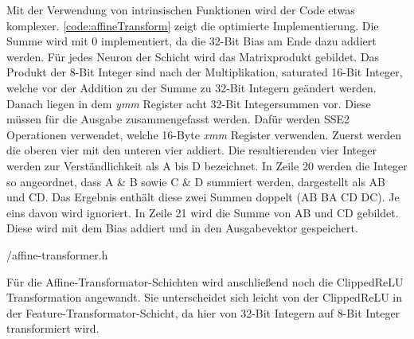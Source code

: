 Mit der Verwendung von intrinsischen Funktionen wird der Code etwas komplexer. \autoref{code:affineTransform} zeigt die optimierte Implementierung. Die Summe wird mit 0 implementiert, da die 32-Bit Bias am Ende dazu addiert werden. Für jedes Neuron der Schicht wird das Matrixprodukt gebildet. Das Produkt der 8-Bit Integer sind nach der Multiplikation, saturated 16-Bit Integer, welche vor der Addition zu der Summe zu 32-Bit Integern geändert werden. Danach liegen in dem \emph{ymm} Register acht 32-Bit Integersummen vor. Diese müssen für die Ausgabe zusammengefasst werden. Dafür werden \ac{SSE2} Operationen verwendet, welche 16-Byte \emph{xmm} Register verwenden. Zuerst werden die oberen vier mit den unteren vier addiert. Die resultierenden vier Integer werden zur Verständlichkeit als A bis D bezeichnet. In Zeile 20 werden die Integer so angeordnet, dass A \& B sowie C \& D summiert werden, dargestellt als AB und CD. Das Ergebnis enthält diese zwei Summen doppelt (AB BA CD DC). Je eins davon wird ignoriert. In Zeile 21 wird die Summe von AB und CD gebildet. Diese wird mit dem Bias addiert und in den Ausgabevektor gespeichert.


{\srcloc/affine-transformer.h}

Für die Affine-Transformator-Schichten wird anschließend noch die Clipped\ac{ReLU} Transformation angewandt. Sie unterscheidet sich leicht von der Clipped\ac{ReLU} in der Feature-Transformator-Schicht, da hier von 32-Bit Integern auf 8-Bit Integer transformiert wird.